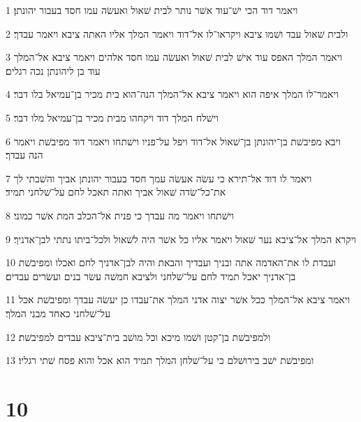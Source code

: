 \par 1 ויאמר דוד הכי ישׁ־עוד אשׁר נותר לבית שׁאול ואעשׂה עמו חסד בעבור יהונתן׃
\par 2 ולבית שׁאול עבד ושׁמו ציבא ויקראו־לו אל־דוד ויאמר המלך אליו האתה ציבא ויאמר עבדך׃
\par 3 ויאמר המלך האפס עוד אישׁ לבית שׁאול ואעשׂה עמו חסד אלהים ויאמר ציבא אל־המלך עוד בן ליהונתן נכה רגלים׃
\par 4 ויאמר־לו המלך איפה הוא ויאמר ציבא אל־המלך הנה־הוא בית מכיר בן־עמיאל בלו דבר׃
\par 5 וישׁלח המלך דוד ויקחהו מבית מכיר בן־עמיאל מלו דבר׃
\par 6 ויבא מפיבשׁת בן־יהונתן בן־שׁאול אל־דוד ויפל על־פניו וישׁתחו ויאמר דוד מפיבשׁת ויאמר הנה עבדך׃
\par 7 ויאמר לו דוד אל־תירא כי עשׂה אעשׂה עמך חסד בעבור יהונתן אביך והשׁבתי לך את־כל־שׂדה שׁאול אביך ואתה תאכל לחם על־שׁלחני תמיד׃
\par 8 וישׁתחו ויאמר מה עבדך כי פנית אל־הכלב המת אשׁר כמוני׃
\par 9 ויקרא המלך אל־ציבא נער שׁאול ויאמר אליו כל אשׁר היה לשׁאול ולכל־ביתו נתתי לבן־אדניך׃
\par 10 ועבדת לו את־האדמה אתה ובניך ועבדיך והבאת והיה לבן־אדניך לחם ואכלו ומפיבשׁת בן־אדניך יאכל תמיד לחם על־שׁלחני ולציבא חמשׁה עשׂר בנים ועשׂרים עבדים׃
\par 11 ויאמר ציבא אל־המלך ככל אשׁר יצוה אדני המלך את־עבדו כן יעשׂה עבדך ומפיבשׁת אכל על־שׁלחני כאחד מבני המלך׃
\par 12 ולמפיבשׁת בן־קטן ושׁמו מיכא וכל מושׁב בית־ציבא עבדים למפיבשׁת׃
\par 13 ומפיבשׁת ישׁב בירושׁלם כי על־שׁלחן המלך תמיד הוא אכל והוא פסח שׁתי רגליו׃

\chapter{10}

